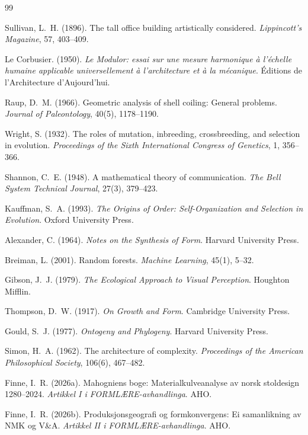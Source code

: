 \documentclass[12pt,a4paper,oneside]{report}
\begin{document}
\begin{thebibliography}{99}

Sullivan, L.~H. (1896).
The tall office building artistically considered.
\textit{Lippincott's Magazine}, 57, 403--409.

Le Corbusier. (1950).
\textit{Le Modulor: essai sur une mesure harmonique \`{a} l'\'{e}chelle humaine applicable universellement \`{a} l'architecture et \`{a} la m\'{e}canique}.
\'{E}ditions de l'Architecture d'Aujourd'hui.

Raup, D.~M. (1966).
Geometric analysis of shell coiling: General problems.
\textit{Journal of Paleontology}, 40(5), 1178--1190.

Wright, S. (1932).
The roles of mutation, inbreeding, crossbreeding, and selection in evolution.
\textit{Proceedings of the Sixth International Congress of Genetics}, 1, 356--366.

Shannon, C.~E. (1948).
A mathematical theory of communication.
\textit{The Bell System Technical Journal}, 27(3), 379--423.

Kauffman, S.~A. (1993).
\textit{The Origins of Order: Self-Organization and Selection in Evolution}.
Oxford University Press.

Alexander, C. (1964).
\textit{Notes on the Synthesis of Form}.
Harvard University Press.

Breiman, L. (2001).
Random forests.
\textit{Machine Learning}, 45(1), 5--32.

Gibson, J.~J. (1979).
\textit{The Ecological Approach to Visual Perception}.
Houghton Mifflin.

Thompson, D.~W. (1917).
\textit{On Growth and Form}.
Cambridge University Press.

Gould, S.~J. (1977).
\textit{Ontogeny and Phylogeny}.
Harvard University Press.

Simon, H.~A. (1962).
The architecture of complexity.
\textit{Proceedings of the American Philosophical Society}, 106(6), 467--482.

Finne, I.~R. (2026a).
Mahogniens boge: Materialkulveanalyse av norsk stoldesign 1280--2024.
\textit{Artikkel I i FORMLÆRE-avhandlinga}. AHO.

Finne, I.~R. (2026b).
Produksjonsgeografi og formkonvergens: Ei samanlikning av NMK og V\&A.
\textit{Artikkel II i FORMLÆRE-avhandlinga}. AHO.


\end{thebibliography}
\end{document}
